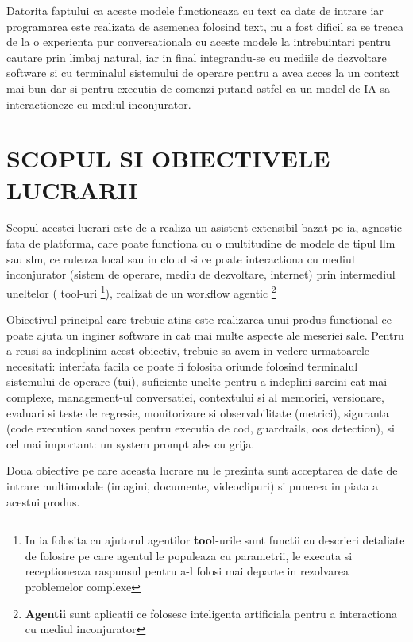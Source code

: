 \documentclass[12pt, a4paper, oneside, romanian, draft]{teza-upb}
\begin{document}
  Datorita faptului ca aceste modele functioneaza cu text ca date de intrare iar programarea este realizata de asemenea folosind
  text, nu a fost dificil sa se treaca de la o experienta pur conversationala cu aceste modele la intrebuintari pentru cautare prin
  limbaj natural, iar in final integrandu-se cu mediile de dezvoltare software si cu terminalul sistemului de operare pentru
  a avea acces la un context mai bun dar si pentru executia de comenzi putand astfel ca un model de IA sa interactioneze cu
  mediul inconjurator.

\section*{SCOPUL SI OBIECTIVELE LUCRARII}

  Scopul acestei lucrari este de a realiza un asistent extensibil bazat pe \ac{ia}, agnostic fata de platforma, care poate functiona cu o multitudine
  de modele de tipul \ac{llm} sau \ac{slm}, ce ruleaza local sau in cloud si ce poate interactiona cu mediul inconjurator (sistem de operare, mediu de dezvoltare,
  internet) prin intermediul uneltelor (
    tool-uri
    \footnote{In \ac{ia} folosita cu ajutorul agentilor \textbf{tool}-urile sunt functii cu descrieri detaliate 
    de folosire pe care agentul le populeaza cu parametrii, le executa si receptioneaza raspunsul pentru 
    a-l folosi mai departe in rezolvarea problemelor complexe}), realizat de un workflow agentic
    \footnote{\textbf{Agentii} sunt aplicatii ce folosesc inteligenta artificiala pentru a interactiona cu mediul inconjurator}

  Obiectivul principal care trebuie atins este realizarea unui produs functional ce poate ajuta un inginer software in cat mai multe aspecte ale meseriei sale.
  Pentru a reusi sa indeplinim acest obiectiv, trebuie sa avem in vedere urmatoarele necesitati: interfata facila ce poate fi folosita oriunde folosind terminalul
  sistemului de operare (\ac{tui}), suficiente unelte pentru a indeplini sarcini cat mai complexe, management-ul conversatiei, contextului si al memoriei,
  versionare, evaluari si teste de regresie, monitorizare si observabilitate (metrici), siguranta (code execution sandboxes pentru
  executia de cod, guardrails, \ac{oos} detection), si cel mai important: un system prompt ales cu grija.

  Doua obiective pe care aceasta lucrare nu le prezinta sunt acceptarea de date de intrare multimodale (imagini, documente, videoclipuri)
  si punerea in piata a acestui produs.
\end{document}
